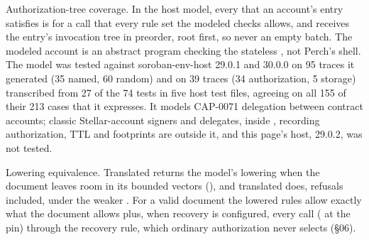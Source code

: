\begin{perchstatement}{}{Authorization-tree coverage.}\label{stmt:authorization-tree-coverage}
In the host model, every  that an account's entry satisfies is for a call that every rule set the modeled  checks allows, and  receives the entry's invocation tree in preorder, root first, so never an empty batch. The modeled account is an abstract program checking the stateless , not Perch's shell. The model was tested against soroban-env-host 29.0.1 and 30.0.0 on 95 traces it generated (35 named, 60 random) and on 39 traces (34 authorization, 5 storage) transcribed from 27 of the 74 tests in five host test files, agreeing on all 155 of their 213 cases that it expresses. It models CAP-0071 delegation between contract accounts; classic Stellar-account signers and delegates,  inside , recording authorization, TTL and footprints are outside it, and this page's host, 29.0.2, was not tested.
\end{perchstatement}
\begin{perchstatement}{}{Lowering equivalence.}\label{stmt:lowering-equivalence}
Translated  returns the model's lowering when the document leaves room in its bounded vectors (), and translated  does, refusals included, under the weaker . For a valid document the lowered rules allow exactly what the document allows plus, when recovery is configured, every  call ( at the pin) through the recovery rule, which ordinary authorization never selects (\S{}06).
\end{perchstatement}
